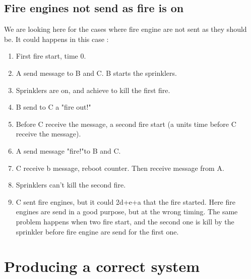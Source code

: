 \documentclass[a4paper,11pt]{article} %
\begin{document}
\subsection{Fire engines not send as fire is on}
We are looking here for the cases where fire engine are not sent as they should be.
It could happens in this case : 
\begin{enumerate}
\item First fire start, time 0.
\item A send message to B and C. B starts the sprinklers.
\item Sprinklers are on, and achieve to kill the first fire.
\item B send to C a "fire out!"
\item Before C receive the message, a second fire start (a units time before C receive the message).
\item A send message "fire!"to B and C. 
\item C receive b message, reboot counter. Then receive message from A.
\item Sprinklers can't kill the second fire.
\item C sent fire engines, but it could 2d+e+a that the fire started.
Here fire engines are send in a good purpose, but at the wrong timing. The same problem happens when two fire start, and the second one is kill by the sprinkler before fire engine are send for the first one.
\end{enumerate}
\newpage
\section{Producing a correct system}
\end{document}
